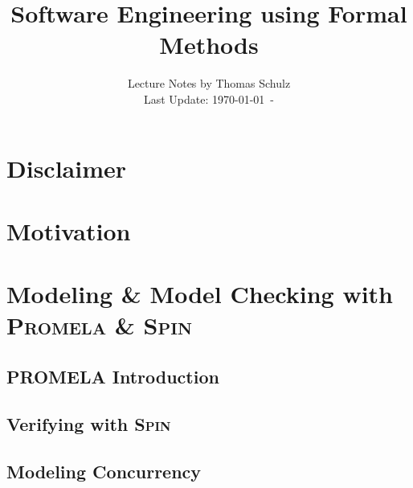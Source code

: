 \documentclass[12pt,accentcolor=tud1b,bibtotoc,colorback,linedtoc,liststotoc,bigchapter,noresetcounter]{tudreport}
\title{Software Engineering using Formal Methods}
\subtitle{Lecture Notes by Thomas Schulz\\
Last Update: \today \ - \thistime}
\newcommand{\capitals}[1]{\textsc{#1}}
\begin{document}
 

\maketitle
\tableofcontents


\begin{acronym}[Promela]
\setlength{\itemsep}{-\parsep}
\end{acronym}


\chapter*{Disclaimer}


\newpage

\chapter*{Motivation}


\newpage



\chapter{Modeling \& Model Checking with \capitals{Promela} \& \capitals{Spin}}


\section{PROMELA Introduction}


\newpage

\section{Verifying with \capitals{Spin}}

\newpage

\section{Modeling Concurrency}
\end{document}
